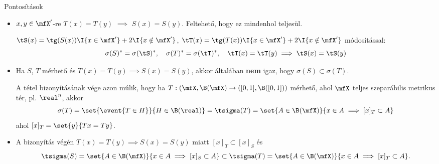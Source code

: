 \documentclass[aspectratio=169,notheorems,9pt,\option]{beamer}
\begin{document}
\begin{frame}{Pontosítások}
  \begin{itemize}
    \item $x,y\in \mfX'$-re $T(x)=T(y)$ $\implies$ $S(x)=S(y)$. Feltehető, hogy ez mindenhol teljesül.
    
    $\tS(x)=\tg(S(x))\I{x\in \mfX'}+2\I{x\notin\mfX'}$, 
    $\tT(x)=\tg(T(x))\I{x\in \mfX'}+2\I{x\notin\mfX'}$ módosítással:
    \begin{displaymath}
      \sigma(S)^*=\sigma(\tS)^*,\quad \sigma(T)^*=\sigma(\tT)^*,\quad 
      \tT(x)=\tT(y) \implies\tS(x)=\tS(y)
    \end{displaymath} 
    \item  Ha $S$, $T$ mérhető és $T(x)=T(y)\implies S(x)=S(y)$, akkor általában \textbf{nem} igaz, 
    hogy $\sigma(S)\subset\sigma(T)$. 

    A tétel bizonyításának vége azon múlik, hogy ha $T:(\mfX,\B(\mfX)\to([0,1],\B([0,1]))$ mérhető, 
    ahol $\mfX$ teljes szeparábilis metrikus tér, pl. $\real^n$, akkor 
    \begin{displaymath}
      \sigma(T)=\set{\event{T\in H}}{H\in\B(\real)}=\tsigma(T)=\set{A\in\B(\mfX)}{x\in A\implies [x]_T\subset A}
    \end{displaymath}
    ahol $[x]_T=\set{y}{Tx=Ty}$.
    
    \item A bizonyítás végén $T(x)=T(y)\implies S(x)=S(y)$ miatt $[x]_T\subset [x]_S$ és 
    \begin{displaymath}
      \tsigma(S)=\set{A\in\B(\mfX)}{x\in A\implies [x]_S\subset A}\subset
      \tsigma(T)=\set{A\in\B(\mfX)}{x\in A\implies [x]_T\subset A}.
    \end{displaymath}
  \end{itemize}
\end{frame}
\end{document}
